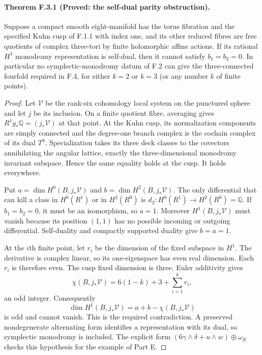 \paragraph{Theorem F.3.1 (Proved: the self-dual parity obstruction).}
Suppose a compact smooth eight-manifold has the torus fibration
and the specified Kuhn cusp of F.1.1 with index one, and its
other reduced fibres are free quotients of complex three-tori
by finite holomorphic affine actions.  If its rational
$H^1$ monodromy representation is self-dual, then it cannot
satisfy $b_1=b_2=0$.  In particular no symplectic-monodromy
datum of F.2 can give the three-connected fourfold required
in F.4, for either $k=2$ or $k=3$ (or any number $k$ of finite
points).

\begin{proof}
Let $\mathcal V$ be the rank-six cohomology local system on
the punctured sphere and let $j$ be its inclusion.  On a finite
quotient fibre, averaging gives $R^1g_*\mathbb Q=(j_*\mathcal V)$
at that point.  At the Kuhn cusp, its normalization components
are simply connected and the degree-one branch complex is
the cochain complex of its dual $T^3$.  Specialization takes
its three deck classes to the covectors annihilating the
angular lattice, exactly the three-dimensional monodromy
invariant subspace.  Hence the same equality holds at the cusp.
It holds everywhere.

Put $a=\dim H^0(B,j_*\mathcal V)$ and
$b=\dim H^2(B,j_*\mathcal V)$.  The only differential that
can kill a class in $H^0(R^1)$ or in $H^2(R^0)$ is
$d_2:H^0(R^1)\to H^2(R^0)=\mathbb Q$.  If $b_1=b_2=0$,
it must be an isomorphism, so $a=1$.  Moreover
$H^1(B,j_*\mathcal V)$ must vanish because its position
$(1,1)$ has no possible incoming or outgoing differential.
Self-duality and compactly supported duality give $b=a=1$.

At the $i$th finite point, let $r_i$ be the dimension of the
fixed subspace in $H^1$.  The derivative is complex linear,
so its one-eigenspace has even real dimension.  Each $r_i$
is therefore even.  The cusp fixed dimension is three.
Euler additivity gives
\[
 \chi(B,j_*\mathcal V)=6(1-k)+3+\sum_{i=1}^k r_i,
\]
an odd integer.  Consequently
\[
 \dim H^1(B,j_*\mathcal V)=a+b-\chi(B,j_*\mathcal V)
\]
is odd and cannot vanish.  This is the required contradiction.
A preserved nondegenerate alternating form identifies a
representation with its dual, so symplectic monodromy is
included.  The explicit form
$(6\gamma\wedge\delta+u\wedge w)\oplus\omega_E$
checks this hypothesis for the example of Part E.
\end{proof}

